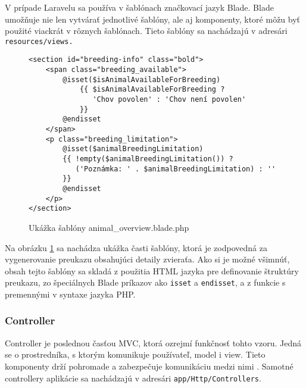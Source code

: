 V prípade Laravelu sa používa v šablónach značkovací jazyk Blade. Blade umožňuje nie len vytvárať jednotlivé šablóny, ale aj komponenty, ktoré môžu byť použité viackrát v rôznych šablónach. Tieto šablóny sa nachádzajú v adresári \texttt{resources/views.}

\begin{figure}[H]
\begin{minipage}[]{\linewidth}
\begin{verbatim}
<section id="breeding-info" class="bold">
    <span class="breeding_available">
        @isset($isAnimalAvailableForBreeding)
            {{ $isAnimalAvailableForBreeding ?
               'Chov povolen' : 'Chov není povolen' 
            }}
        @endisset
    </span>
    <p class="breeding_limitation">
        @isset($animalBreedingLimitation)
        {{ !empty($animalBreedingLimitation()) ?
           ('Poznámka: ' . $animalBreedingLimitation) : '' 
        }}
        @endisset
    </p>
</section>
\end{verbatim}
\end{minipage}
\caption[Ukážka šablóny animal\_overview.blade.php]
{Ukážka šablóny animal\_overview.blade.php}
\label{animal-overview-view-code}
\end{figure}

Na obrázku \ref{animal-overview-view-code} sa nachádza ukážka časti šablóny, ktorá je zodpovedná za vygenerovanie preukazu obsahujúci detaily zvieraťa. Ako si je možné všimnúť, obsah tejto šablóny sa skladá z použitia HTML jazyka pre definovanie štruktúry preukazu, zo špeciálnych Blade príkazov ako \texttt{isset} a \texttt{endisset}, a z funkcie s premennými v syntaxe jazyka PHP.\pagebreak

\subsubsection*{Controller}
Controller je poslednou časťou MVC, ktorá ozrejmí funkčnosť tohto vzoru. Jedná se o prostredníka, s ktorým komunikuje používateľ, model i view. Tieto komponenty drží pohromade a zabezpečuje komunikáciu medzi nimi \cite{mvc-architektura}. Samotné controllery aplikácie sa nachádzajú v adresári \texttt{app/Http/Controllers}.

